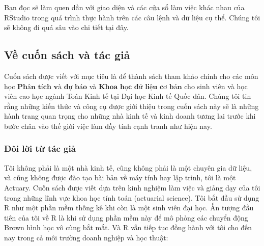 \documentclass[
]{article}
\begin{document}
Bạn đọc sẽ làm quen dần với giao diện và các cửa sổ làm việc khác nhau của RStudio trong quá trình thực hành trên các câu lệnh và dữ liệu cụ thể. Chúng tôi sẽ không đi quá sâu vào chi tiết tại đây.

\hypertarget{vux1ec1-cuux1ed1n-suxe1ch-vuxe0-tuxe1c-giux1ea3}{%
\subsection{Về cuốn sách và tác giả}\label{vux1ec1-cuux1ed1n-suxe1ch-vuxe0-tuxe1c-giux1ea3}}

Cuốn sách được viết với mục tiêu là để thành sách tham khảo chính cho các môn học \(\textbf{Phân tích và dự báo}\) và \(\textbf{Khoa học dữ liệu cơ bản}\) cho sinh viên và học viên cao học ngành Toán Kinh tế tại Đại học Kinh tế Quốc dân. Chúng tôi tin rằng những kiến thức và công cụ được giới thiệu trong cuốn sách này sẽ là những hành trang quan trọng cho những nhà kinh tế và kinh doanh tương lai trước khi bước chân vào thế giới việc làm đầy tính cạnh tranh như hiện nay.

\hypertarget{ux111uxf4i-lux1eddi-tux1eeb-tuxe1c-giux1ea3}{%
\subsubsection{Đôi lời từ tác giả}\label{ux111uxf4i-lux1eddi-tux1eeb-tuxe1c-giux1ea3}}

Tôi không phải là một nhà kinh tế, cũng không phải là một chuyên gia dữ liệu, và cũng không được đào tạo bài bản về máy tính hay lập trình, tôi là một Actuary. Cuốn sách được viết dựa trên kinh nghiệm làm việc và giảng dạy của tôi trong những lĩnh vực khoa học tính toán (actuarial science). Tôi bắt đầu sử dụng R như một phần mềm thống kê khi còn là một sinh viên đại học. Ấn tượng đầu tiên của tôi về R là khi sử dụng phần mềm này để mô phỏng các chuyển động Brown hình học vô cùng bắt mắt. Và R vẫn tiếp tục đồng hành với tôi cho đến nay trong cả môi trường doanh nghiệp và học thuật:
\end{document}
